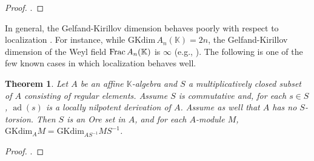 \documentclass[12pt, a4paper]{amsart}
\newtheorem{theorem}{Theorem}[section]
\newcommand{\Weyl}{A_n(\mathbb{K})} %
\newcommand{\GKdim}{\text{GKdim}}    %
\def\k{\mathbb K}
\newcommand{\Frac}{{\rm{Frac}}}
\def\k{\mathbb K}
\begin{document}
\begin{proof}
    \cite[Proposition 1.6(d)]{Lorenz0}.
\end{proof}
In general, the Gelfand-Kirillov dimension behaves poorly with respect to localization \cite[Chapter 4]{KL}. For instance, while $\GKdim \, \Weyl=2n$, the Gelfand-Kirillov dimension of the Weyl field $\Frac \, \Weyl$ is $\infty$ (e.g., \cite[Theorem 8.17]{KL}). The following is one of the few known cases in which localization behaves well.
\begin{theorem}\label{basic-GK-2}
    Let $A$ be an affine $\k$-algebra and $S$ a multiplicatively closed subset of $A$ consisting of regular elements. Assume $S$ is commutative and, for each $s \in S$, $\operatorname{ad}(s)$ is a locally nilpotent derivation of $A$. Assume as well that $A$ has no $S$-torsion. Then $S$ is an Ore set in $A$, and for each $A$-module $M$, $\GKdim_A M= \GKdim_{AS^{-1}} MS^{-1}$.
\end{theorem}
\begin{proof}
    \cite[Theorem 3.2]{Lorenz0}.
\end{proof}
\end{document}
